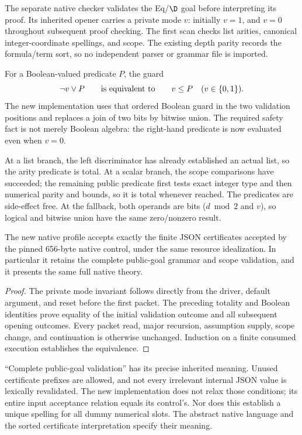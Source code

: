 The separate native checker validates the Eq/$\D$ goal before interpreting
its proof. Its inherited opener carries a private mode $v$: initially
$v=1$, and $v=0$ throughout subsequent proof checking. The first scan
checks list arities, canonical integer-coordinate spellings, and scope.
The existing depth parity records the formula/term sort, so no independent
parser or grammar file is imported.

For a Boolean-valued predicate $P$, the guard
\[
            \neg v\lor P\qquad\hbox{is equivalent to}\qquad v\le P
            \quad(v\in\{0,1\}).
\]
The new implementation uses that ordered Boolean guard in the two
validation positions and replaces a join of two bits by bitwise union.
The required safety fact is not merely Boolean algebra: the right-hand
predicate is now evaluated even when $v=0$.

At a list branch, the left discriminator has already established an
actual list, so the arity predicate is total. At a scalar branch, the
scope comparisons have succeeded; the remaining public predicate first
tests exact integer type and then numerical parity and bounds, so it is
total whenever reached. The predicates are side-effect free. At the
fallback, both operands are bits ($d\bmod2$ and $v$), so logical and
bitwise union have the same zero/nonzero result.

\begin{theorem}
The new native profile accepts exactly the finite JSON certificates
accepted by the pinned 656-byte native control, under the same resource
idealization. In particular it retains the complete public-goal grammar
and scope validation, and it presents the same full native theory.
\end{theorem}
\begin{proof}
The private mode invariant follows directly from the driver, default
argument, and reset before the first packet. The preceding totality and
Boolean identities prove equality of the initial validation outcome and
all subsequent opening outcomes. Every packet read, major recursion,
assumption supply, scope change, and continuation is otherwise unchanged.
Induction on a finite consumed execution establishes the equivalence.
\end{proof}

``Complete public-goal validation'' has its precise inherited meaning.
Unused certificate prefixes are allowed, and not every irrelevant
internal JSON value is lexically revalidated. The new implementation
does not relax those conditions; its entire input acceptance relation
equals its control's. Nor does this establish a unique spelling for all
dummy numerical slots. The abstract native language and the sorted
certificate interpretation specify their meaning.

